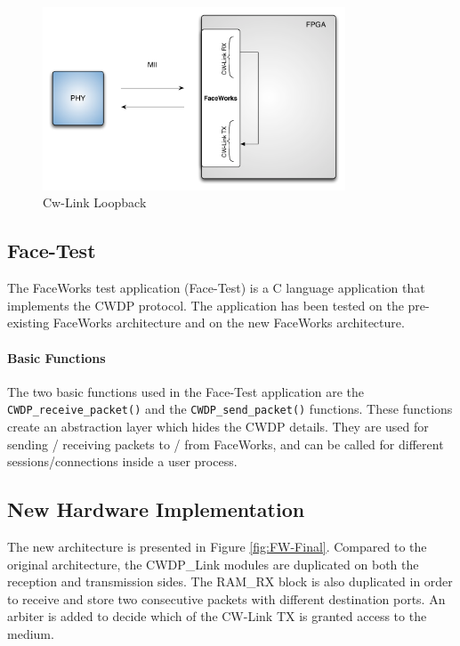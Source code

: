 \documentclass[conference]{IEEEtran}
\begin{document}
\begin{figure}[h]
  \centering
      \includegraphics[width=9cm]{Diagrams/CW-LoopBack_paper.pdf}
  \caption{Cw-Link Loopback}\label{fig:CW-LoopBack}
\end{figure}

\subsection{Face-Test}

The FaceWorks test application (Face-Test) is a C language application that implements the CWDP protocol. The application has been tested on the pre-existing FaceWorks architecture and on the new FaceWorks architecture.

\paragraph*{Basic Functions}
The two basic functions used in the Face-Test application are the {\tt CWDP\_receive\_packet()} and the {\tt CWDP\_send\_packet()} functions. These functions create an abstraction layer which hides the CWDP details. They are used for sending / receiving packets to / from FaceWorks, and can be called for different sessions/connections inside a user process.

\subsection{New Hardware Implementation}

The new architecture is presented in Figure \ref{fig:FW-Final}. Compared to the original architecture, the CWDP\_Link modules are duplicated on both the reception and transmission sides. The RAM\_RX block is also duplicated in order to receive and store two consecutive packets with different destination ports. An arbiter is added to decide which of the CW-Link TX is granted access to the medium.
\end{document}
